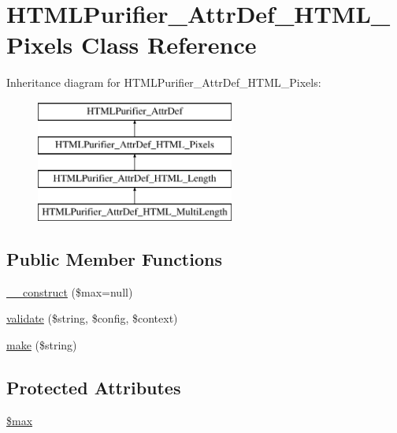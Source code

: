 \hypertarget{classHTMLPurifier__AttrDef__HTML__Pixels}{\section{H\+T\+M\+L\+Purifier\+\_\+\+Attr\+Def\+\_\+\+H\+T\+M\+L\+\_\+\+Pixels Class Reference}
\label{classHTMLPurifier__AttrDef__HTML__Pixels}
}
Inheritance diagram for H\+T\+M\+L\+Purifier\+\_\+\+Attr\+Def\+\_\+\+H\+T\+M\+L\+\_\+\+Pixels\+:\begin{figure}[H]
\begin{center}
\leavevmode
\includegraphics[height=4.000000cm]{classHTMLPurifier__AttrDef__HTML__Pixels}
\end{center}
\end{figure}
\subsection*{Public Member Functions}
\begin{DoxyCompactItemize}
\item 
\hyperlink{classHTMLPurifier__AttrDef__HTML__Pixels_af1b1918862e41a2c87f70d4035c10bdf}{\+\_\+\+\_\+construct} (\$max=null)
\item 
\hyperlink{classHTMLPurifier__AttrDef__HTML__Pixels_a87d84a5a93ea287a239aa2c8b2f9632c}{validate} (\$string, \$config, \$context)
\item 
\hyperlink{classHTMLPurifier__AttrDef__HTML__Pixels_a4d27cb83b6a1915191e2aea7e0da2763}{make} (\$string)
\end{DoxyCompactItemize}
\subsection*{Protected Attributes}
\begin{DoxyCompactItemize}
\item 
\hyperlink{classHTMLPurifier__AttrDef__HTML__Pixels_ac015b0271641ab15a9a78b6f770fbb8a}{\$max}
\end{DoxyCompactItemize}
